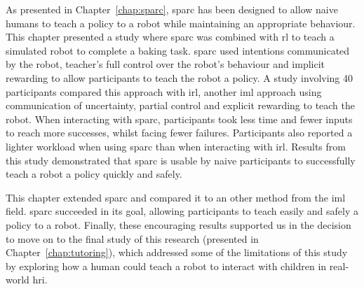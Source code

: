 As presented in Chapter~\ref{chap:sparc}, \gls{sparc} has been designed to allow naive humans to teach a policy to a robot while maintaining an appropriate behaviour. This chapter presented a study where \gls{sparc} was combined with \gls{rl} to teach a simulated robot to complete a baking task. \gls{sparc} used intentions communicated by the robot, teacher's full control over the robot's behaviour and implicit rewarding to allow participants to teach the robot a policy. A study involving 40 participants compared this approach with \gls{irl}, another \gls{iml} approach using communication of uncertainty, partial control and explicit rewarding to teach the robot. When interacting with \gls{sparc}, participants took less time and fewer inputs to reach more successes, whilst facing fewer failures. Participants also reported a lighter workload when using \gls{sparc} than when interacting with \gls{irl}. Results from this study demonstrated that \gls{sparc} is usable by naive participants to successfully teach a robot a policy quickly and safely.
%

This chapter extended \gls{sparc} and compared it to an other method from the \gls{iml} field. \gls{sparc} succeeded in its goal, allowing participants to teach easily and safely a policy to a robot. Finally, these encouraging results supported us in the decision to move on to the final study of this research (presented in Chapter~\ref{chap:tutoring}), which addressed some of the limitations of this study by exploring how a human could teach a robot to interact with children in real-world \gls{hri}.

